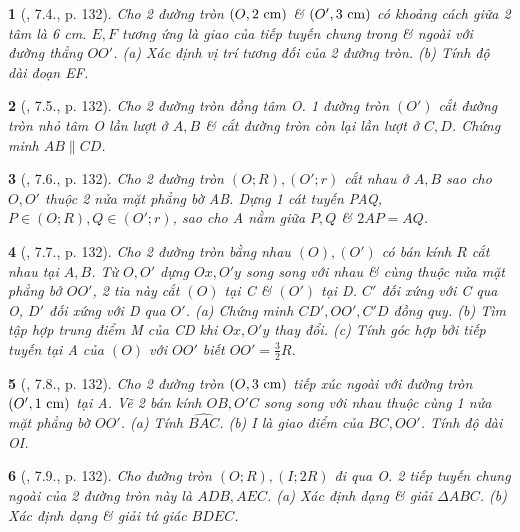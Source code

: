 \documentclass{article}
\newtheorem{baitoan}{}
\begin{document}
\begin{baitoan}[\cite{Binh_boi_duong_Toan_9_tap_1}, 7.4., p. 132]
	Cho 2 đường tròn $(O,2\ {\rm cm})$ \& $(O',3\ {\rm cm})$ có khoảng cách giữa 2 tâm là {\rm6 cm}. $E,F$ tương ứng là giao của tiếp tuyến chung trong \& ngoài với đường thẳng $OO'$. (a) Xác định vị trí tương đối của 2 đường tròn. (b) Tính độ dài đoạn EF.
\end{baitoan}

\begin{baitoan}[\cite{Binh_boi_duong_Toan_9_tap_1}, 7.5., p. 132]
	Cho 2 đường tròn đồng tâm O. 1 đường tròn $(O')$ cắt đường tròn nhỏ tâm O lần lượt ở $A,B$ \& cắt đường tròn còn lại lần lượt ở $C,D$. Chứng minh $AB\parallel CD$.
\end{baitoan}

\begin{baitoan}[\cite{Binh_boi_duong_Toan_9_tap_1}, 7.6., p. 132]
	Cho 2 đường tròn $(O;R),(O';r)$ cắt nhau ở $A,B$ sao cho $O,O'$ thuộc 2 nửa mặt phẳng bờ AB. Dựng 1 cát tuyến PAQ, $P\in(O;R),Q\in(O';r)$, sao cho A nằm giữa $P,Q$ \& $2AP = AQ$.
\end{baitoan}

\begin{baitoan}[\cite{Binh_boi_duong_Toan_9_tap_1}, 7.7., p. 132]
	Cho 2 đường tròn bằng nhau $(O),(O')$ có bán kính $R$ cắt nhau tại $A,B$. Từ $O,O'$ dựng $Ox,O'y$ song song với nhau \& cùng thuộc nửa mặt phẳng bở $OO'$, 2 tia này cắt $(O)$ tại C \& $(O')$ tại D. $C'$ đối xứng với C qua O, $D'$ đối xứng với D qua $O'$. (a) Chứng minh $CD',OO',C'D$ đồng quy. (b) Tìm tập hợp trung điểm M của CD khi $Ox,O'y$ thay đổi. (c) Tính góc hợp bởi tiếp tuyến tại A của $(O)$ với $OO'$ biết $OO' = \frac{3}{2}R$.
\end{baitoan}

\begin{baitoan}[\cite{Binh_boi_duong_Toan_9_tap_1}, 7.8., p. 132]
	Cho 2 đường tròn $(O,3\ {\rm cm})$ tiếp xúc ngoài với đường tròn $(O',1\ {\rm cm})$ tại A. Vẽ 2 bán kính $OB,O'C$ song song với nhau thuộc cùng 1 nửa mặt phẳng bờ $OO'$. (a) Tính $\widehat{BAC}$. (b) I là giao điểm của $BC,OO'$. Tính độ dài OI.
\end{baitoan}

\begin{baitoan}[\cite{Binh_boi_duong_Toan_9_tap_1}, 7.9., p. 132]
	Cho đường tròn $(O;R),(I;2R)$ đi qua O. 2 tiếp tuyến chung ngoài của 2 đường tròn này là $ADB,AEC$. (a) Xác định dạng \& giải $\Delta ABC$. (b) Xác định dạng \& giải tứ giác $BDEC$.
\end{baitoan}
\end{document}
